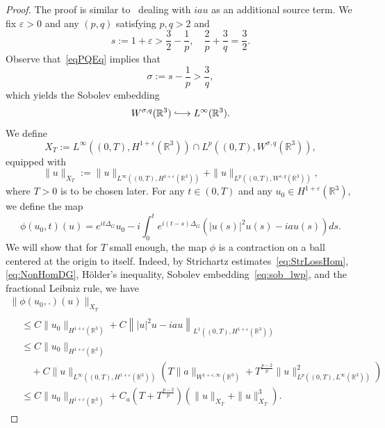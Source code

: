 \documentclass[AHL,Unicode,longabstracts,published]{cedram}
\newcommand*\R{\mathbb{R}}
\newcommand*\eps{\varepsilon}
\newcommand{\longhookrightarrow}{\lhook\joinrel\longrightarrow}
\newcommand*{\hookto}{\mathchoice{\longhookrightarrow}{\hookrightarrow}{\hookrightarrow}{\hookrightarrow}}
\begin{document}
\begin{proof}
The proof is similar to~\cite[Proposition~3.1]{BuGeTz04} dealing with $iau$ as an additional source term. We fix $\eps>0$ and any $(p,q)$ satisfying $p,q>2$ and
\begin{equation}\label{eqPQEq}
s := 1 + \eps > \frac 32 - \frac 1p, \quad\frac 2p + \frac 3q = \frac 32.
\end{equation}
Observe that~\eqref{eqPQEq} implies that
\begin{equation*}
\sigma := s - \frac 1p> \frac 3q,
\end{equation*}
which yields the Sobolev embedding
\begin{equation}\label{eq:sob_lwp}
W^{\sigma, q}(\R^3) \hookto L^\infty(\R^3).
\end{equation}
We define
\begin{equation*}
X_{T} := L^\infty\left((0,T), H^{1 + \eps}(\R^3)\right) \cap L^p\left((0,T), W^{\sigma, q}(\R^3)\right),
\end{equation*}
equipped with
\begin{equation*}
\| u \|_{X_T} := \| u \|_{L^\infty\left((0,T), H^{1 + \eps}(\R^3)\right)} + \| u \|_{ L^p\left((0,T), W^{s, q}(\R^3)\right)},
\end{equation*}
where $T>0$ is to be chosen later. For any $t \in (0,T)$ and any $u_0 \in H^{1 + \eps}(\R^3)$, we define the map
\begin{equation*}
\phi(u_0,t)(u) = e^{it\Delta_G} u_0 - i \int_0^t e^{i(t-s)\Delta_G} \left(|u(s)|^{2} u(s) - i a u(s)\right) ds.
\end{equation*}
We will show that for $T$ small enough, the map $\phi$ is a contraction on a ball centered at the origin to itself. Indeed, by Strichartz estimates~\eqref{eq:StrLossHom}, \eqref{eq:NonHomDG}, H{\"o}lder's inequality, Sobolev embedding~\eqref{eq:sob_lwp}, and the fractional Leibniz rule, we have
\begin{multline*}
\| \phi(u_0,.) (u) \|_{X_T}\\
\begin{aligned}
&\leq C \| u_0 \|_{H^{1 + \eps}(\R^3)} + C \left\| |u|^{2} u - i a u \right\|_{L^1\left((0,T), H^{1 + \eps}(\R^3)\right)} \\
& \leq C \| u_0 \|_{H^{1 + \eps}(\R^3)} \\
&\quad + C \| u \|_{L^\infty\left((0,T),H^{1 + \eps}(\R^3)\right)} \left(T\| a \|_{W^{1 +\eps,\infty}(\R^3)} + T^{\frac{p - 2}{p}} \| u \|^{2}_{L^p\left((0,T), L^\infty(\R^3)\right)}\right) \\
&\leq C \| u_0 \|_{H^{1 + \eps}(\R^3)} + C_a\left(T + T^{\frac{p- 2}{p}}\right)\left(\| u \|_{X_T} + \| u \|_{X_T}^{3}\right).

\end{aligned}
\end{multline*}
\end{proof}
\end{document}
